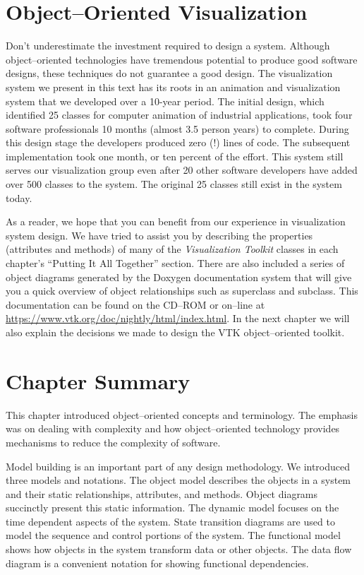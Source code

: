 \section{Object--Oriented Visualization}

Don't underestimate the investment required to design a system. Although object--oriented technologies have tremendous potential to produce good software designs, these techniques do not guarantee a good design. The visualization system we present in this text has its roots in an animation \cite{Lorensen89} and visualization system \cite{Schroeder92} that we developed over a 10-year period. The initial design, which identified 25 classes for computer animation of industrial applications, took four software professionals 10 months (almost 3.5 person years) to complete. During this design stage the developers produced zero (!) lines of code. The subsequent implementation took one month, or ten percent of the effort. This system still serves our visualization group even after 20 other software developers have added over 500 classes to the system. The original 25 classes still exist in the system today.

As a reader, we hope that you can benefit from our experience in visualization system design. We have tried to assist you by describing the properties (attributes and methods) of many of the \emph{Visualization Toolkit} classes in each chapter's ``Putting It All Together'' section. There are also included a series of object diagrams generated by the Doxygen documentation system that will give you a quick overview of object relationships such as superclass and subclass. This documentation can be found on the CD--ROM or on--line at \href{https://www.vtk.org/doc/nightly/html/index.html}{https://www.vtk.org/doc/nightly/html/index.html}. In the next chapter we will also explain the decisions we made to design the VTK object--oriented toolkit.

\section{Chapter Summary}

This chapter introduced object--oriented concepts and terminology. The emphasis was on dealing with complexity and how object--oriented technology provides mechanisms to reduce the complexity of software.

Model building is an important part of any design methodology. We introduced three models and notations. The object model describes the objects in a system and their static relationships, attributes, and methods. Object diagrams succinctly present this static information. The dynamic model focuses on the time dependent aspects of the system. State transition diagrams are used to model the sequence and control portions of the system. The functional model shows how objects in the system transform data or other objects. The data flow diagram is a convenient notation for showing functional dependencies.

